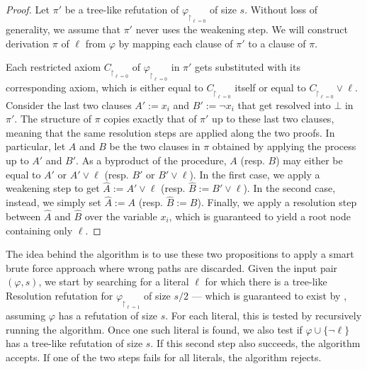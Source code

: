 \begin{proof}
    Let $\pi'$ be a tree-like refutation of $\varphi_{\upharpoonright_{\ell = 0}}$ of size $s$. Without loss of generality, we assume that $\pi'$ never uses the weakening step. We will construct derivation $\pi$ of $\ell$ from $\varphi$ by mapping each clause of $\pi'$ to a clause of $\pi$.

    Each restricted axiom $C_{\upharpoonright_{\ell = 0}}$ of $\varphi_{\upharpoonright_{\ell = 0}}$ in $\pi'$ gets substituted with its corresponding axiom, which is either equal to $C_{\upharpoonright_{\ell = 0}}$ itself or equal to $C_{\upharpoonright_{\ell = 0}} \lor {\ell}$. Consider the last two clauses $A' := x_i$ and $B' := \lnot x_i$ that get resolved into $\bot$ in $\pi'$. The structure of $\pi$ copies exactly that of $\pi'$ up to these last two clauses, meaning that the same resolution steps are applied along the two proofs. In particular, let $A$ and $B$ be the two clauses in $\pi$ obtained by applying the process up to $A'$ and $B'$. As a byproduct of the procedure, $A$ (resp. $B$) may either be equal to $A'$ or $A' \lor \ell$ (resp. $B'$ or $B' \lor \ell$). In the first case, we apply a weakening step to get $\widehat{A} := A' \lor \ell$ (resp. $\widehat{B} := B' \lor \ell$). In the second case, instead, we simply set $\widehat{A} := A$ (resp. $\widehat{B} := B$). Finally, we apply a resolution step between $\widehat{A}$ and $\widehat{B}$ over the variable $x_i$, which is guaranteed to yield a root node containing only $\ell$.
\end{proof}

The idea behind the algorithm is to use these two propositions to apply a smart brute force approach where wrong paths are discarded. Given the input pair $(\varphi, s)$, we start by searching for a literal $\ell$ for which there is a tree-like Resolution refutation for $\varphi_{\upharpoonright_{\ell = 1}}$ of size $s/2$ --- which is guaranteed to exist by , assuming $\varphi$ has a refutation of size $s$. For each literal, this is tested by recursively running the algorithm. Once one such literal is found, we also test if $\varphi \cup \{\lnot \ell\}$ has a tree-like refutation of size $s$. If this second step also succeeds, the algorithm accepts. If one of the two steps fails for all literals, the algorithm rejects.

